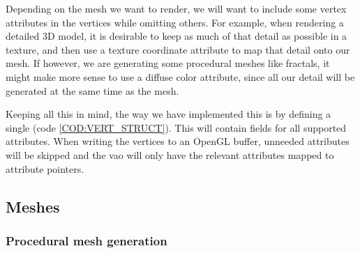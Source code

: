 Depending on the mesh we want to render,
we will want to include some vertex attributes in the vertices while omitting others.
For example,
when rendering a detailed 3D model,
it is desirable to keep as much of that detail as possible in a texture,
and then use a texture coordinate attribute to map that detail onto our mesh.
If however,
we are generating some procedural meshes like fractals,
it might make more sense to use a diffuse color attribute,
since all our detail will be generated at the same time as the mesh.

Keeping all this in mind,
the way we have implemented this is by defining a single  (code \ref{COD:VERT_STRUCT}).
This  will contain fields for all supported attributes.
When writing the vertices to an OpenGL buffer,
unneeded attributes will be skipped and the \ac{vao} will only have the relevant attributes mapped to attribute pointers.


\subsection{Meshes}


\subsubsection{Procedural mesh generation}

